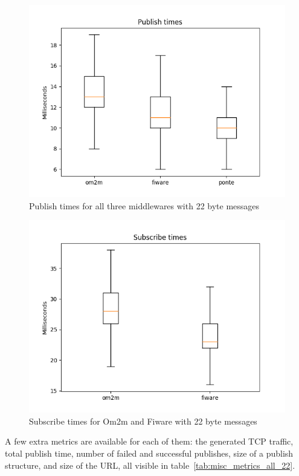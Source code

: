 \documentclass[conference]{IEEEtran}
\begin{document}
\begin{figure}[htbp!]
  \centering
  \includegraphics[width=\columnwidth]{figures/om2m_fiware_ponte_publish_times.png}
  \caption{Publish times for all three middlewares with 22 byte messages}
  \label{fig:publish_times}
\end{figure}

\begin{figure}[htbp!]
  \centering
  \includegraphics[width=\columnwidth]{figures/om2m_fiware_subscribe_times.png}
  \caption{Subscribe times for Om2m and Fiware with 22 byte messages}
  \label{fig:subscribe_times}
\end{figure}

A few extra metrics are available for each of them: the generated TCP traffic, total publish time, number of failed and successful publishes, size of a publish structure, and size of the URL, all visible in table~\ref{tab:misc_metrics_all_22}.
\end{document}
